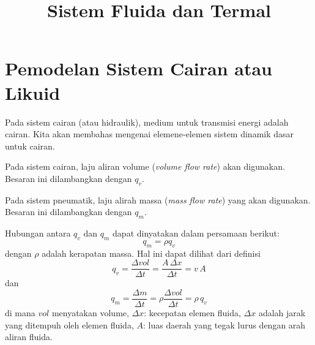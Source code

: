 \documentclass[a4paper]{article}
\begin{document}
\title{Sistem Fluida dan Termal}
\author{}
\maketitle

\section{Pemodelan Sistem Cairan atau Likuid}

Pada sistem cairan (atau hidraulik), medium untuk transmisi energi adalah cairan.
Kita akan membahas mengenai elemene-elemen sistem dinamik dasar untuk cairan.

Pada sistem cairan, laju aliran volume (\textit{volume flow rate}) akan digunakan.
Besaran ini dilambangkan dengan $q_{v}$.

Pada sistem pneumatik, laju alirah massa (\textit{mass flow rate}) yang akan digunakan.
Besaran ini dilambangkan dengan $q_{m}$.

Hubungan antara $q_{v}$ dan $q_{m}$ dapat dinyatakan dalam persamaan berikut:
\begin{equation*}
q_m = \rho q_v
\end{equation*}
dengan $\rho$ adalah kerapatan massa. Hal ini dapat dilihat dari definisi
\begin{equation*}
q_v = \frac{\Delta vol}{\Delta t} = \frac{A \, \Delta x}{\Delta t} = v \, A
\end{equation*}
dan
\begin{equation*}
q_m = \frac{\Delta m}{\Delta t} = \rho \frac{\Delta vol}{\Delta t} = \rho \, q_v
\end{equation*}
di mana $vol$ menyatakan volume,
$\Delta x$: kecepatan elemen fluida,
$\Delta x$ adalah jarak yang ditempuh oleh elemen fluida,
$A$: luas daerah yang tegak lurus dengan arah aliran fluida.
\end{document}
